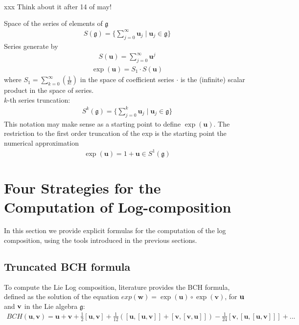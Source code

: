 xxx Think about it after 14 of may!

Space of the series of elements of $\mathfrak{g}$
\begin{align*}
S(\mathfrak{g}) = \{ \sum_{j=0}^{\infty} \mathbf{u}_{j} \mid \mathbf{u}_{j} \in \mathfrak{g}  \}
\end{align*}
Series generate by 
\begin{align*}
S(\mathbf{u}) =\sum_{j=0}^{\infty} \mathbf{u}^{j} 
\end{align*}
\begin{align*}
\exp(\mathbf{u}) = S_1  \cdot S(\mathbf{u}) 
\end{align*}
where $S_1 = \sum_{k=0}^{\infty} (\frac{1}{k!})$ in the space of coefficient series $\cdot $ is the (infinite) scalar product in the space of series.\\
$k$-th series truncation:
\begin{align*}
S^{k}(\mathfrak{g})  = \{ \sum_{j=0}^{k} \mathbf{u}_{j} \mid \mathbf{u}_{j} \in \mathfrak{g}  \}
\end{align*}
This notation may make sense as a starting point to define $\exp(\mathbf{u})$. 
The restriction to the first order truncation of the exp is the starting point the numerical approximation
\begin{align*}
\exp(\mathbf{u}) = 1 + \mathbf{u} \in S^{1}(\mathfrak{g}) 
\end{align*}


\section{Four Strategies for the Computation of Log-composition}\label{ch:accelerating}

In this section we provide explicit formulas for the computation of the log composition, using the tools introduced in the previous sections.

\subsection{Truncated BCH formula}\label{se:bch_formula}

To compute the Lie Log composition, literature provides the BCH formula, defined as the solution of the equation $exp(\mathbf{w}) = \exp(\mathbf{u}) \circ \exp(\mathbf{v})$, for $\bf{u}$ and $\bf{v}$ in the Lie algebra $\mathfrak{g}$:
\begin{align*}
	BCH(\mathbf{u},\mathbf{v}) 
	= 
	\mathbf{u} + \mathbf{v} + \frac{1}{2}[\mathbf{u},\mathbf{v}] + \frac{1}{12}([\mathbf{u},[\mathbf{u},\mathbf{v}]]
	+ [\mathbf{v},[\mathbf{v},\mathbf{u}]]) - \frac{1}{24}[\mathbf{v},[\mathbf{u},[\mathbf{u},\mathbf{v}]]] +... 
\end{align*}

